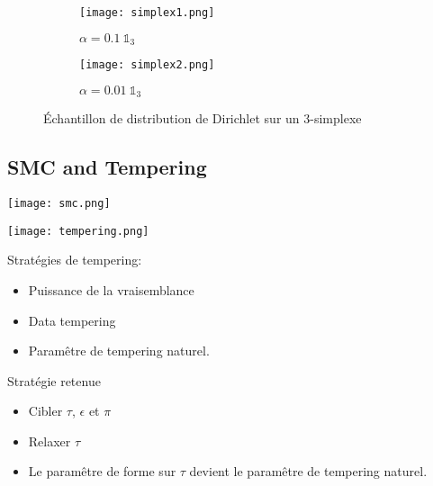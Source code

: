 \documentclass{beamer}
\newcommand{\fr}[1]{#1}
\newcommand{\en}[1]{}
\begin{document}
\begin{frame}[fragile]

\end{frame}




\begin{frame}
\begin{figure}[H]

     \begin{subfigure}[b]{0.49\textwidth}
\texttt{[image: simplex1.png]}
\caption{$\alpha=0.1~\mathds{1}_3$}
\end{subfigure}%
     \begin{subfigure}[b]{0.49\textwidth}
\texttt{[image: simplex2.png]}
\caption{$\alpha=0.01~\mathds{1}_3$}
     \end{subfigure}
\caption{ \fr{Échantillon de distribution de Dirichlet sur un 3-simplexe} \en{Dirichlet sample on the 3-simplex}}
\end{figure}
\end{frame}

\subsection{SMC and Tempering}

\begin{frame}[fragile]
\texttt{[image: smc.png]}
%
\end{frame}


\begin{frame}[fragile]
\texttt{[image: tempering.png]}
%
\end{frame}

\begin{frame}
Stratégies de tempering:
\begin{itemize}
\item Puissance de la vraisemblance
\item Data tempering
\item Paramêtre de tempering naturel.
\end{itemize}
\end{frame}

\begin{frame}
Stratégie retenue
\begin{itemize}
\item Cibler $\tau$, $\epsilon$ et $\pi$
\item Relaxer $\tau$
\item Le paramêtre de forme sur $\tau$ devient le paramêtre de tempering naturel.
\end{itemize}
\end{frame}
\end{document}
